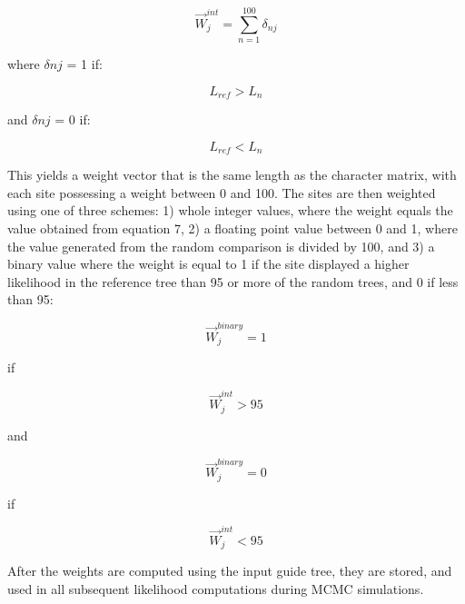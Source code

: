 \documentclass[12pt]{article}
\begin{document}
\begin{equation}
\overrightarrow{W}^{int}_j = \sum\limits_{n=1}^{100}\delta_{nj}
\end{equation}

where $\delta nj$ = 1 if:

\begin{equation}
L_{ref} > L_n 
\end{equation}

and $\delta nj$ = 0 if:

\begin{equation}
L_{ref} < L_n 
\end{equation}

This yields a weight vector that is the same length as the character
matrix, with each site possessing a weight between 0 and 100. The sites
are then weighted using one of three schemes: 1) whole integer values,
where the weight equals the value obtained from equation 7, 2) a
floating point value between 0 and 1, where the value generated from the
random comparison is divided by 100, and 3) a binary value where the
weight is equal to 1 if the site displayed a higher likelihood in the
reference tree than 95 or more of the random trees, and 0 if less than
95:

\begin{equation}
\overrightarrow{W}^{binary}_j = 1
\end{equation}

if 

\begin{equation}
\overrightarrow{W}^{int}_j > 95 
\end{equation}

and

\begin{equation}
\overrightarrow{W}^{binary}_j = 0
\end{equation}

if

\begin{equation}
\overrightarrow{W}^{int}_j <  95
\end{equation}

After the weights are computed using the input guide tree, they are stored, and used in all subsequent likelihood computations during MCMC simulations.
\end{document}
